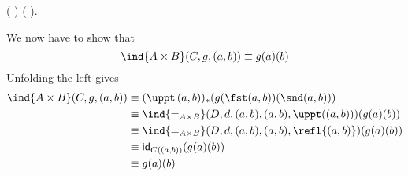 \begin{coqdoccode}
\coqdocindent{2.00em}
\coqdocnotation{(} \coqdocnotation{)} \coqdocnotation{\#} \coqdocnotation{(} ( ) ( )\coqdocnotation{)}.\coqdoceol
\coqdocemptyline
\end{coqdoccode}


We now have to show that
\[
\ind{A \times B}(C, g, (a, b)) 
\equiv g(a)(b)
\]
Unfolding the left gives
\begin{align*}
\ind{A \times B}(C, g, (a, b)) 
&\equiv
(\uppt\, (a, b))_{*}(g(\fst (a, b))(\snd (a, b)))
\\&\equiv
\ind{=_{A \times B}}(D, d, (a, b), (a, b), \uppt((a, b)))(g(a)(b))
\\&\equiv
\ind{=_{A \times B}}(D, d, (a, b), (a, b), \refl{(a, b)})
(g(a)(b))
\\&\equiv
\mathsf{id}_{C((a, b))}(g(a)(b))
\\&\equiv
g(a)(b)
\end{align*}
